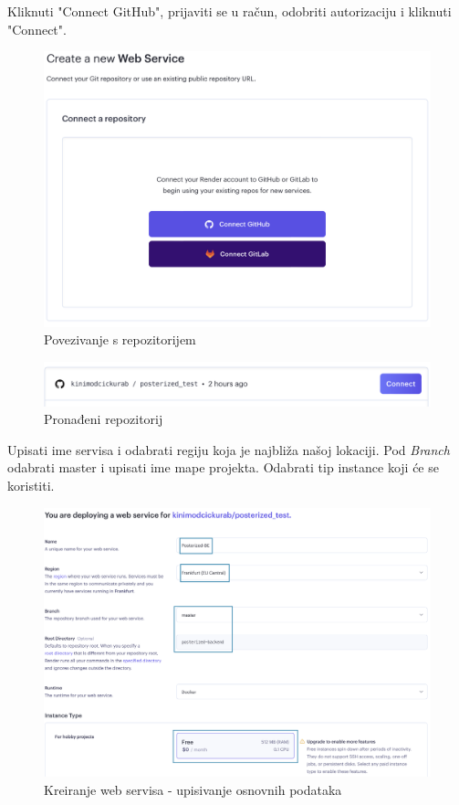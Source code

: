 			\pagebreak
			Kliknuti "Connect GitHub", prijaviti se u račun, odobriti autorizaciju i kliknuti "Connect".
			\begin{figure}[H]
				\includegraphics[scale=0.25]{slike/deploy/backend2.png} %
				\centering
				\caption{Povezivanje s repozitorijem}
				\label{fig:promjene}
			\end{figure}
			
			\begin{figure}[H]
				\includegraphics[scale=0.3]{slike/deploy/backend3.png} %
				\centering
				\caption{Pronađeni repozitorij}
				\label{fig:promjene}
			\end{figure}
			Upisati ime servisa i odabrati regiju koja je najbliža našoj lokaciji.  Pod \textit{Branch} odabrati master i upisati ime mape projekta. Odabrati tip instance koji će se koristiti.
			\begin{figure}[H]
				\includegraphics[scale=0.3]{slike/deploy/backend4.png} %
				\centering
				\caption{Kreiranje web servisa - upisivanje osnovnih podataka}
				\label{fig:promjene}
			\end{figure}
			
